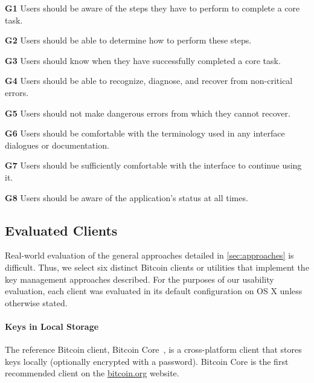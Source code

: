 	
\begin{compactlist}
	\item[\bf G1] Users should be aware of the steps they have to perform to complete a core task.
	\item[\bf G2] Users should be able to determine how to perform these steps.
	\item[\bf G3] Users should know when they have successfully completed a core task.
	\item[\bf G4] Users should be able to recognize, diagnose, and recover from non-critical errors.
	\item[\bf G5] Users should not make dangerous errors from which they cannot recover.
	\item[\bf G6] Users should be comfortable with the terminology used in any interface dialogues or documentation.
	\item[\bf G7] Users should be sufficiently comfortable with the interface to continue using it.
	\item[\bf G8] Users should be aware of the application's status at all times.
\end{compactlist}



\subsection{Evaluated Clients}
Real-world evaluation of the general approaches detailed in \autoref{sec:approaches} is difficult. Thus, we select six distinct Bitcoin clients or utilities that implement the key management approaches described. For the purposes of our usability evaluation, each client was evaluated in its default configuration on OS X unless otherwise stated. 

\paragraph{Keys in Local Storage} The reference Bitcoin client, Bitcoin Core~\cite{bitcoinqt}, is a cross-platform client that stores keys locally (optionally encrypted with a password). Bitcoin Core is the first recommended client on the \url{bitcoin.org} website. 

